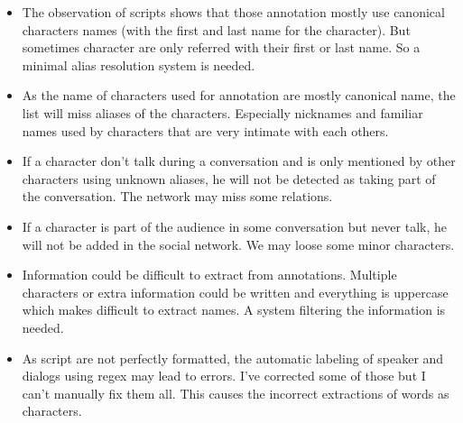 \documentclass[a4paper, 12pt]{report}
\begin{document}
\begin{itemize}
\item 
 The observation of scripts shows that those annotation mostly use canonical characters names (with the first and last name for the character). But sometimes character are only referred with their first or last name. So a minimal alias resolution system is needed. 
\item
As the name of characters used for annotation are mostly canonical name, the list will miss aliases of the characters. Especially nicknames and familiar names used by characters that are very intimate with each others.
\item If a character don't talk during a conversation and is only mentioned by other characters using unknown aliases, he will not be detected as taking part of the conversation. The network may miss some relations.
\item 
If a character is part of the audience in some conversation but never talk, he will not be added in the social network. We may loose some minor characters.
\item Information could be difficult to extract from annotations. Multiple characters or extra information could be written and everything is uppercase which makes difficult to extract names. A system filtering the information is needed.
\item As script are not perfectly formatted, the automatic labeling of speaker and dialogs using regex may lead to errors. I've corrected some of those but I can't manually fix them all. This causes the incorrect extractions of words as characters. 
\end{itemize}
\end{document}
